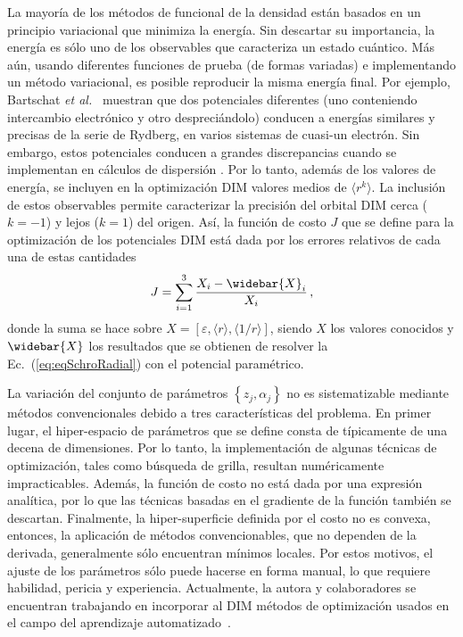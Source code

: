 La mayoría de los métodos de funcional de la densidad están basados en 
un principio variacional que minimiza la energía. Sin 
descartar su importancia, la energía es sólo uno de los observables que 
caracteriza un estado cuántico. Más aún, usando diferentes funciones de 
prueba (de formas variadas) e implementando un método variacional, es 
posible reproducir la misma energía final. Por ejemplo, Bartschat 
\textit{et al.}~\cite{Albright:93,Bartschat:96} muestran que dos 
potenciales diferentes (uno conteniendo intercambio electrónico y otro 
despreciándolo) conducen a energías similares y precisas de la serie de 
Rydberg, en varios sistemas de cuasi-un electrón. Sin embargo, estos 
potenciales conducen a grandes discrepancias cuando se implementan en 
cálculos de dispersión \cite{BartschatBray:96}. Por lo tanto, además de 
los valores de energía, se incluyen en la optimización DIM valores 
medios de $\langle r^k \rangle$. La inclusión de estos 
observables permite caracterizar la precisión del orbital DIM cerca 
($k=-1$) y lejos ($k=1$) del origen. Así, la función de costo $J$ que se 
define para la optimización de los potenciales DIM está dada por los 
errores relativos de cada una de estas cantidades
\begin{equation}
J=\sum_{i=1}^3 \frac{X_i-\widebar{X}_i}{X_i}\,,
\label{eq:fncosto-dim}
\end{equation}
donde la suma se hace sobre 
$X=\left[\varepsilon,\langle r \rangle,\langle 1/r \rangle\right]$, 
siendo $X$ los valores conocidos y $\widebar{X}$ los resultados que se 
obtienen de resolver la Ec.~(\ref{eq:eqSchroRadial}) con el potencial 
paramétrico. 

La variación del conjunto de parámetros $\left\{z_j,\alpha_j\right\}$ no 
es sistematizable mediante métodos convencionales debido a tres 
características del problema. En primer lugar, el hiper-espacio de 
parámetros que se define consta de típicamente de una decena de 
dimensiones. Por lo tanto, la implementación de algunas técnicas de 
optimización, tales como búsqueda de grilla, resultan numéricamente 
impracticables. Además, la función de costo no está dada por una 
expresión analítica, por lo que las técnicas basadas en el gradiente de 
la función también se descartan. Finalmente, la hiper-superficie 
definida por el costo no es convexa, entonces, la aplicación de métodos 
convencionables, que no dependen de la derivada, generalmente sólo 
encuentran mínimos locales. Por estos motivos, el ajuste de los 
parámetros sólo puede hacerse en forma manual, lo que  
requiere habilidad, pericia y experiencia. Actualmente, la autora y 
colaboradores se encuentran trabajando en incorporar al DIM métodos de 
optimización usados en el campo del aprendizaje 
automatizado~\cite{DiFilippo:19}.

